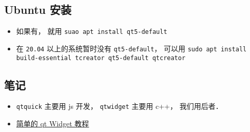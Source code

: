 
\begin{issues}
\issueDraft
\end{issues}

\subsection{Ubuntu 安装}
\begin{itemize}
\item 如果有， 就用 \verb|suao apt install qt5-default|
\item 在 \verb|20.04| 以上的系统暂时没有 \verb|qt5-default|， 可以用 \verb|sudo apt install build-essential tcreator qt5-default qtcreator|
\end{itemize}

\subsection{笔记}
\begin{itemize}
\item \verb|qtquick| 主要用 js 开发，  \verb|qtwidget| 主要用 c++， 我们用后者．
\item \href{https://doc.qt.io/qt-5/qtwidgets-tutorials-notepad-example.html}{简单的 qt Widget 教程}
\end{itemize}
